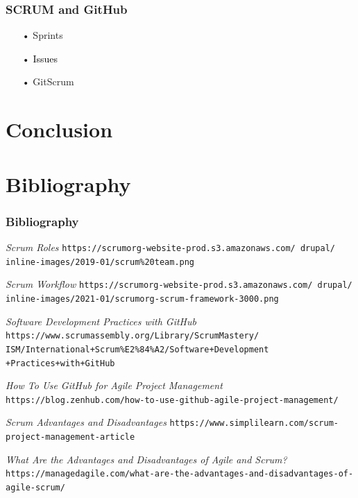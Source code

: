 \documentclass{beamer}
\begin{document}
\begin{frame}
    \frametitle{SCRUM and GitHub}
    \begin{itemize}
    \color{gray}
    \item[•] Sprints
    \item[•] \textcolor{black}{Issues}
    \item[•] GitScrum
    \end{itemize}
\end{frame}


\section{Conclusion}

\begin{frame}
	\begin{itemize}
\end{frame}



\section{Bibliography}

\begin{frame}[allowframebreaks]
	\frametitle{Bibliography}

	\begin{thebibliography}{10}


	\textit{Scrum Roles}
	\texttt{https://scrumorg-website-prod.s3.amazonaws.com/
	drupal/	inline-images/2019-01/scrum\%20team.png}

	\textit{Scrum Workflow}
	\texttt{https://scrumorg-website-prod.s3.amazonaws.com/
	drupal/	inline-images/2021-01/scrumorg-scrum-framework-3000.png}

	\textit{Software Development Practices with GitHub}
	\texttt{https://www.scrumassembly.org/Library/ScrumMastery/\\
	ISM/International+Scrum\%E2\%84\%A2/Software+Development\\
	+Practices+with+GitHub}

	\framebreak

	\textit{How To Use GitHub for Agile Project Management}
	\texttt{https://blog.zenhub.com/how-to-use-github-agile-project-management/}

	\textit{Scrum Advantages and Disadvantages}
	\texttt{https://www.simplilearn.com/scrum-project-management-article}

	\textit{What Are the Advantages and Disadvantages of Agile and Scrum?}
	\texttt{https://managedagile.com/what-are-the-advantages-and-disadvantages-of-agile-scrum/}

	\end{thebibliography}

\end{frame}
\end{document}

